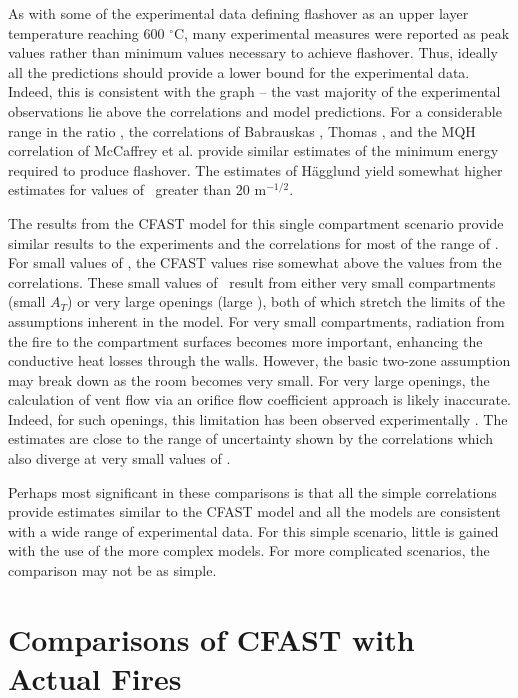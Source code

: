 As with some of the experimental data defining flashover as an upper layer temperature reaching 600 $^{\circ}$C, many experimental measures were reported as peak values rather than minimum values necessary to achieve flashover. Thus, ideally all the predictions should provide a lower bound for the experimental data. Indeed, this is consistent with the graph -- the vast majority of the experimental observations lie above the correlations and model predictions. For a considerable range in the ratio \asqh, the correlations of Babrauskas \cite{Valid:Babrauskas_Flashover}, Thomas \cite{Thomas:1981fk}, and the MQH correlation of McCaffrey et al. \cite{McCaffrey:1981uq} provide similar estimates of the minimum energy required to produce flashover. The estimates of H\"{a}gglund \cite{Hagglund:1980} yield somewhat higher estimates for values of \asqh  \, greater than 20 m$^{-1/2}$.

The results from the CFAST model for this single compartment scenario provide similar results to the experiments and the correlations for most of the range of \asqh. For small values of \asqh, the CFAST values rise somewhat above the values from the correlations. These small values of \asqh \, result from either very small compartments (small $A_T$) or very large openings (large \asqh), both of which stretch the limits of the assumptions inherent in the model. For very small compartments, radiation from the fire to the compartment surfaces becomes more important, enhancing the conductive heat losses through the walls. However, the basic two-zone assumption may break down as the room becomes very small. For very large openings, the calculation of vent flow via an orifice flow coefficient approach is likely inaccurate. Indeed, for such openings, this limitation has been observed experimentally \cite{Valid:Babrauskas_Flashover}. The estimates are close to the range of uncertainty shown by the correlations which also diverge at very small values of \asqh.

Perhaps most significant in these comparisons is that all the simple correlations provide estimates similar to the CFAST model and all the models are consistent with a wide range of experimental data. For this simple scenario, little is gained with the use of the more complex models. For more complicated scenarios, the comparison may not be as simple.

\section{Comparisons of CFAST with Actual Fires}

